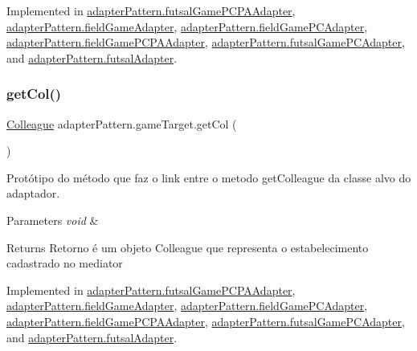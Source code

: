 Implemented in \mbox{\hyperlink{classadapter_pattern_1_1futsal_game_p_c_p_a_adapter_a1a5a0c5d5893c6de4991355684e0452f}{adapter\+Pattern.\+futsal\+Game\+P\+C\+P\+A\+Adapter}}, \mbox{\hyperlink{classadapter_pattern_1_1field_game_adapter_ac7a3e7caa73d727325f59198db4f1674}{adapter\+Pattern.\+field\+Game\+Adapter}}, \mbox{\hyperlink{classadapter_pattern_1_1field_game_p_c_adapter_ae8d757e3ba8fcc7cb9e69def87ebf9be}{adapter\+Pattern.\+field\+Game\+P\+C\+Adapter}}, \mbox{\hyperlink{classadapter_pattern_1_1field_game_p_c_p_a_adapter_affcab1e10cb84628421d756b5660bb69}{adapter\+Pattern.\+field\+Game\+P\+C\+P\+A\+Adapter}}, \mbox{\hyperlink{classadapter_pattern_1_1futsal_game_p_c_adapter_ae1919eb69e2f543d9bf537b9244d803e}{adapter\+Pattern.\+futsal\+Game\+P\+C\+Adapter}}, and \mbox{\hyperlink{classadapter_pattern_1_1futsal_adapter_a7d21aebfd57eb0eaf4aa51e9c8c24fb1}{adapter\+Pattern.\+futsal\+Adapter}}.

\mbox{\label{interfaceadapter_pattern_1_1game_target_ad3fc8b4c4a732bcc875071ed0c081261}} 
\subsubsection{\texorpdfstring{getCol()}{getCol()}}
{\footnotesize\ttfamily \mbox{\hyperlink{classmediator_pattern_1_1_colleague}{Colleague}} adapter\+Pattern.\+game\+Target.\+get\+Col (\begin{DoxyParamCaption}{ }\end{DoxyParamCaption})}



Protótipo do método que faz o link entre o metodo get\+Colleague da classe alvo do adaptador. 


\begin{DoxyParams}{Parameters}
{\em void} & \\
\hline
\end{DoxyParams}
\begin{DoxyReturn}{Returns}
Retorno é um objeto Colleague que representa o estabelecimento cadastrado no mediator 
\end{DoxyReturn}


Implemented in \mbox{\hyperlink{classadapter_pattern_1_1futsal_game_p_c_p_a_adapter_a8b104bff8d91fbd51df1a498a38a67f3}{adapter\+Pattern.\+futsal\+Game\+P\+C\+P\+A\+Adapter}}, \mbox{\hyperlink{classadapter_pattern_1_1field_game_adapter_acdddca2c22e22b6b52dcd4d9d6cd06fc}{adapter\+Pattern.\+field\+Game\+Adapter}}, \mbox{\hyperlink{classadapter_pattern_1_1field_game_p_c_adapter_a6f4f583609bc9bbef0de01f0b845f208}{adapter\+Pattern.\+field\+Game\+P\+C\+Adapter}}, \mbox{\hyperlink{classadapter_pattern_1_1field_game_p_c_p_a_adapter_a3ecb2186e522338f6d1530d4c365581b}{adapter\+Pattern.\+field\+Game\+P\+C\+P\+A\+Adapter}}, \mbox{\hyperlink{classadapter_pattern_1_1futsal_game_p_c_adapter_a5521d22c8ffdcedf28b517679bc19e29}{adapter\+Pattern.\+futsal\+Game\+P\+C\+Adapter}}, and \mbox{\hyperlink{classadapter_pattern_1_1futsal_adapter_adaffc04b294957e46799734741430eb4}{adapter\+Pattern.\+futsal\+Adapter}}.

